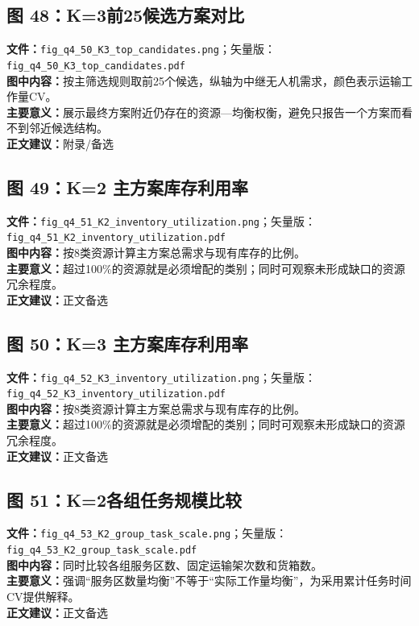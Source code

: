 \subsection*{图 48：K=3前25候选方案对比}
\textbf{文件：}\texttt{fig\_q4\_50\_K3\_top\_candidates.png}；矢量版：\texttt{fig\_q4\_50\_K3\_top\_candidates.pdf}\\
\textbf{图中内容：}按主筛选规则取前25个候选，纵轴为中继无人机需求，颜色表示运输工作量CV。\\
\textbf{主要意义：}展示最终方案附近仍存在的资源—均衡权衡，避免只报告一个方案而看不到邻近候选结构。\\
\textbf{正文建议：}附录/备选

\subsection*{图 49：K=2 主方案库存利用率}
\textbf{文件：}\texttt{fig\_q4\_51\_K2\_inventory\_utilization.png}；矢量版：\texttt{fig\_q4\_51\_K2\_inventory\_utilization.pdf}\\
\textbf{图中内容：}按8类资源计算主方案总需求与现有库存的比例。\\
\textbf{主要意义：}超过100\%的资源就是必须增配的类别；同时可观察未形成缺口的资源冗余程度。\\
\textbf{正文建议：}正文备选

\subsection*{图 50：K=3 主方案库存利用率}
\textbf{文件：}\texttt{fig\_q4\_52\_K3\_inventory\_utilization.png}；矢量版：\texttt{fig\_q4\_52\_K3\_inventory\_utilization.pdf}\\
\textbf{图中内容：}按8类资源计算主方案总需求与现有库存的比例。\\
\textbf{主要意义：}超过100\%的资源就是必须增配的类别；同时可观察未形成缺口的资源冗余程度。\\
\textbf{正文建议：}正文备选

\subsection*{图 51：K=2各组任务规模比较}
\textbf{文件：}\texttt{fig\_q4\_53\_K2\_group\_task\_scale.png}；矢量版：\texttt{fig\_q4\_53\_K2\_group\_task\_scale.pdf}\\
\textbf{图中内容：}同时比较各组服务区数、固定运输架次数和货箱数。\\
\textbf{主要意义：}强调“服务区数量均衡”不等于“实际工作量均衡”，为采用累计任务时间CV提供解释。\\
\textbf{正文建议：}正文备选

